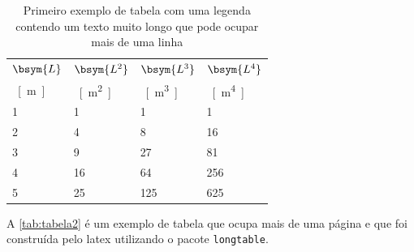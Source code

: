 \begin{table}[htb]%
\caption{Primeiro exemplo de tabela com uma legenda contendo um texto muito longo que pode ocupar mais de uma linha}%
\label{tab:tabela1}%
\begin{tabularx}{\textwidth}{@{\extracolsep{\fill}}llll}%
\toprule
$\bsym{L}$ & $\bsym{L^2}$ & $\bsym{L^3}$ & $\bsym{L^4}$ \\
\SI{}{[m]} & \SI{}{[m^2]} & \SI{}{[m^3]} & \SI{}{[m^4]} \\ \midrule
1          & 1            & 1            & 1            \\
2          & 4            & 8            & 16           \\
3          & 9            & 27           & 81           \\
4          & 16           & 64           & 256          \\
5          & 25           & 125          & 625          \\ \bottomrule
\end{tabularx}
\fonte{}%
\end{table}

A \autoref{tab:tabela2} é um exemplo de tabela que ocupa mais de uma página e que foi construída pelo \gls{latex} utilizando o pacote \texttt{longtable}.

